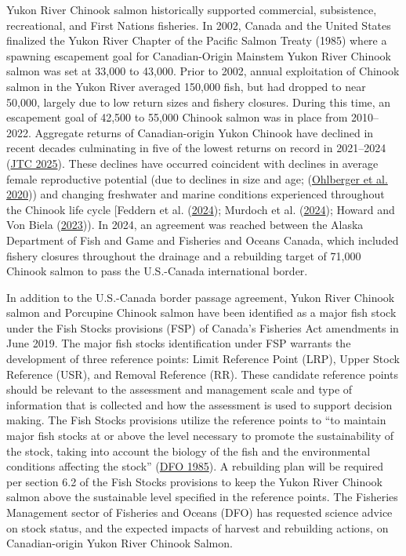 \documentclass[11pt]{book}
\begin{document}
Yukon River Chinook salmon historically supported commercial, subsistence, recreational, and First Nations fisheries. In 2002, Canada and the United States finalized the Yukon River Chapter of the Pacific Salmon Treaty (1985) where a spawning escapement goal for Canadian-Origin Mainstem Yukon River Chinook salmon was set at 33,000 to 43,000. Prior to 2002, annual exploitation of Chinook salmon in the Yukon River averaged 150,000 fish, but had dropped to near 50,000, largely due to low return sizes and fishery closures. During this time, an escapement goal of 42,500 to 55,000 Chinook salmon was in place from 2010--2022. Aggregate returns of Canadian-origin Yukon Chinook have declined in recent decades culminating in five of the lowest returns on record in 2021--2024 (\protect\hyperlink{ref-JTC2025Report}{JTC 2025}). These declines have occurred coincident with declines in average female reproductive potential (due to declines in size and age; (\protect\hyperlink{ref-ohlberger_reproductive_2020}{Ohlberger et al. 2020})) and changing freshwater and marine conditions experienced throughout the Chinook life cycle {[}Feddern et al. (\protect\hyperlink{ref-feddern2024}{2024}); Murdoch et al. (\protect\hyperlink{ref-murdoch2024}{2024}); Howard and Von Biela (\protect\hyperlink{ref-howard2023}{2023})). In 2024, an agreement was reached between the Alaska Department of Fish and Game and Fisheries and Oceans Canada, which included fishery closures throughout the drainage and a rebuilding target of 71,000 Chinook salmon to pass the U.S.-Canada international border.

In addition to the U.S.-Canada border passage agreement, Yukon River Chinook salmon and Porcupine Chinook salmon have been identified as a major fish stock under the Fish Stocks provisions (FSP) of Canada's Fisheries Act amendments in June 2019. The major fish stocks identification under FSP warrants the development of three reference points: Limit Reference Point (LRP), Upper Stock Reference (USR), and Removal Reference (RR). These candidate reference points should be relevant to the assessment and management scale and type of information that is collected and how the assessment is used to support decision making. The Fish Stocks provisions utilize the reference points to ``to maintain major fish stocks at or above the level necessary to promote the sustainability of the stock, taking into account the biology of the fish and the environmental conditions affecting the stock'' (\protect\hyperlink{ref-DFO1985Act}{DFO 1985}). A rebuilding plan will be required per section 6.2 of the Fish Stocks provisions to keep the Yukon River Chinook salmon above the sustainable level specified in the reference points. The Fisheries Management sector of Fisheries and Oceans (DFO) has requested science advice on stock status, and the expected impacts of harvest and rebuilding actions, on Canadian-origin Yukon River Chinook Salmon.
\end{document}
